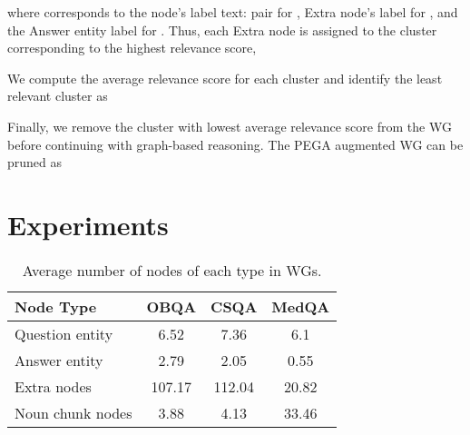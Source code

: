 \documentclass[11pt]{article}
\begin{document}
where  corresponds to the node's label text:
 pair for ,
Extra node's label  for , and
the Answer entity label  for .
Thus, each Extra node  is assigned to the cluster  corresponding to the highest relevance score,

We compute the average relevance score for each cluster and identify the least relevant cluster  as

Finally, we remove the cluster with lowest average relevance score from the WG before continuing with graph-based reasoning.
The PEGA augmented WG can be pruned as



\section{Experiments}
\label{sec:experiments}

\begin{table}[b]
\caption{Average number of nodes of each type in WGs.}
\centering
\tabcolsep=0.12cm
\begin{tabular}{lccc}
\toprule
\textbf{Node Type} & \textbf{OBQA}  & \textbf{CSQA}  & \textbf{MedQA}  \\
\midrule
Question entity   & 6.52          & 7.36          & 6.1             \\
Answer entity     & 2.79          & 2.05          & 0.55            \\
Extra nodes     & 107.17        & 112.04        & 20.82           \\
Noun chunk nodes  & 3.88          & 4.13          & 33.46          \\
\bottomrule

\end{tabular}


\label{tab:nodecount}
\end{table}
\end{document}
